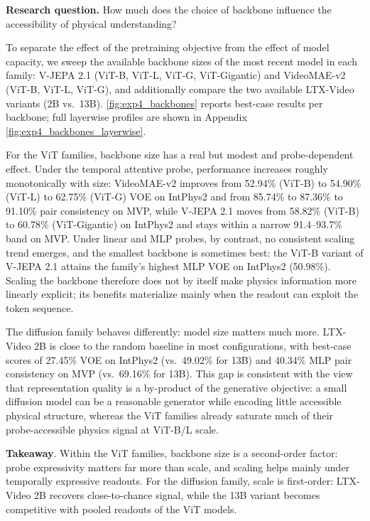 \begin{researchquestionbox}
\textbf{Research question.}
How much does the choice of backbone influence the accessibility of physical
understanding?
\end{researchquestionbox}

To separate the effect of the pretraining objective from the effect of model
capacity, we sweep the available backbone sizes of the most recent model in
each family: V-JEPA 2.1 (ViT-B, ViT-L, ViT-G, ViT-Gigantic) and VideoMAE-v2
(ViT-B, ViT-L, ViT-G), and additionally compare the two available LTX-Video
variants (2B vs.\ 13B). \autoref{fig:exp4_backbones} reports best-case results
per backbone; full layerwise profiles are shown in Appendix
\autoref{fig:exp4_backbones_layerwise}.

For the ViT families, backbone size has a real but modest and probe-dependent
effect. Under the temporal attentive probe, performance increases roughly
monotonically with size: VideoMAE-v2 improves from 52.94\% (ViT-B) to 54.90\%
(ViT-L) to 62.75\% (ViT-G) VOE on IntPhys2 and from 85.74\% to 87.36\% to
91.10\% pair consistency on MVP, while V-JEPA 2.1 moves from 58.82\% (ViT-B) to
60.78\% (ViT-Gigantic) on IntPhys2 and stays within a narrow 91.4--93.7\% band
on MVP. Under linear and MLP probes, by contrast, no consistent scaling trend
emerges, and the smallest backbone is sometimes best: the ViT-B variant of
V-JEPA 2.1 attains the family's highest MLP VOE on IntPhys2 (50.98\%). Scaling
the backbone therefore does not by itself make physics information more
linearly explicit; its benefits materialize mainly when the readout can exploit
the token sequence.

The diffusion family behaves differently: model size matters much more.
LTX-Video 2B is close to the random baseline in most configurations, with
best-case scores of 27.45\% VOE on IntPhys2 (vs.\ 49.02\% for 13B) and 40.34\%
MLP pair consistency on MVP (vs.\ 69.16\% for 13B).
This gap is consistent with the view that representation quality is a
by-product of the generative objective: a small diffusion model can be a
reasonable generator while encoding little accessible physical structure,
whereas the ViT families already saturate much of their probe-accessible
physics signal at ViT-B/L scale.

\begin{takeawaybox}
\textbf{Takeaway}.
Within the ViT families, backbone size is a second-order factor: probe
expressivity matters far more than scale, and scaling helps mainly under
temporally expressive readouts. For the diffusion family, scale is
first-order: LTX-Video 2B recovers close-to-chance signal, while the 13B
variant becomes competitive with pooled readouts of the ViT models.
\end{takeawaybox}


